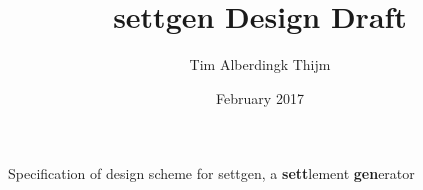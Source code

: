 \documentclass[12pt]{book}
\title{settgen Design Draft}
\author{Tim Alberdingk Thijm}
\date{February 2017}
\begin{document}
\begin{titlepage}
\maketitle
\end{titlepage}

Specification of design scheme for settgen, a \textbf{sett}lement \textbf{gen}erator
\end{document}
